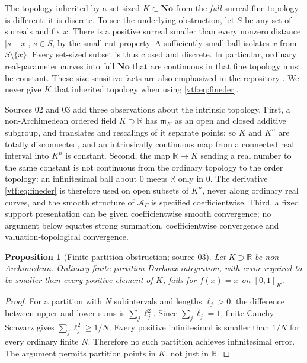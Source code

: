 \documentclass[11pt,letterpaper]{article}
\newtheorem{proposition}[theorem]{Proposition}
\theoremstyle{definition}
\theoremstyle{remark}
\newcommand{\No}{\mathbf{No}}
\newcommand{\R}{\mathbb R}\newcommand{\C}{\mathbb C}
\newcommand{\A}{\mathscr A}\newcommand{\OO}{\mathcal O}\newcommand{\mm}{\mathfrak m}
\begin{document}
The topology inherited by a set-sized $K\subset\No$ from the \emph{full}
surreal fine topology is different: it is discrete. To see the underlying
obstruction, let $S$ be any set of surreals and fix $x$. There is a positive
surreal smaller than every nonzero distance $|s-x|$, $s\in S$, by the
small-cut property. A sufficiently small ball isolates $x$ from $S\setminus
\{x\}$. Every set-sized subset is thus closed and discrete. In particular,
ordinary real-parameter curves into full $\No$ that are continuous in that
fine topology must be constant. These size-sensitive facts are also emphasized
in the repository \cite{RepoFound}. We never give $K$ that inherited topology
when using \eqref{vtf:eq:fineder}.

Sources 02 and 03 add three observations about the intrinsic topology. First, a
non-Archimedean ordered field $K\supset\R$ has $\mm_K$ as an open and closed
additive subgroup, and translates and rescalings of it separate points; so $K$
and $K^n$ are totally disconnected, and an intrinsically continuous map from a
connected real interval into $K^n$ is constant. Second, the map $\R\to K$
sending a real number to the same constant is not continuous from the ordinary
topology to the order topology: an infinitesimal ball about $0$ meets $\R$ only
in $0$. The derivative \eqref{vtf:eq:fineder} is therefore used on open subsets
of $K^n$, never along ordinary real curves, and the smooth structure of
$\A_\Gamma$ is specified coefficientwise. Third, a fixed support presentation
can be given coefficientwise smooth convergence; no argument below equates
strong summation, coefficientwise convergence and valuation-topological
convergence.

\begin{proposition}[Finite-partition obstruction; source 03]\label{vtf:3d:prop:darboux}
Let $K\supset\R$ be non-Archimedean. Ordinary finite-partition Darboux integration, with error required to be smaller than every positive element of $K$, fails for $f(x)=x$ on $[0,1]_K$.
\end{proposition}
\begin{proof}
For a partition with $N$ subintervals and lengths $\ell_j>0$, the difference between upper and lower sums is $\sum_j\ell_j^2$. Since $\sum_j\ell_j=1$, finite Cauchy--Schwarz gives $\sum_j\ell_j^2\geq1/N$. Every positive infinitesimal is smaller than $1/N$ for every ordinary finite $N$. Therefore no such partition achieves infinitesimal error. The argument permits partition points in $K$, not just in $\R$.
\end{proof}
\end{document}
